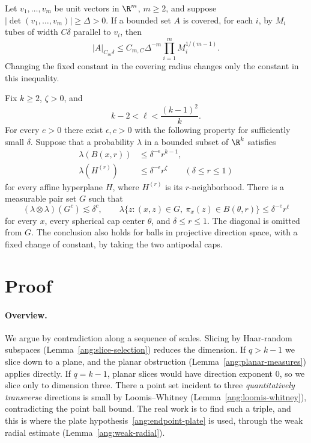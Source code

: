 \documentclass[11pt,reqno]{amsart}
\begin{document}
\begin{lemma}\label{ang:loomis-whitney}
Let $v_1,\ldots,v_m$ be unit vectors in $\R^m$, $m\ge2$, and suppose
$|\det(v_1,\ldots,v_m)|\ge\Delta>0$. If a bounded set $A$ is covered,
for each $i$, by $M_i$ tubes of width $C\delta$ parallel to $v_i$, then
\[
 |A|_{C_m\delta}\le C_{m,C}\Delta^{-m}
       \prod_{i=1}^m M_i^{1/(m-1)}.
\]
Changing the fixed constant in the covering radius changes only the
constant in this inequality.
\end{lemma}

\begin{lemma}\label{ang:weak-radial}
Fix $k\ge2$, $\zeta>0$, and
\[
 k-2<\ell<\frac{(k-1)^2}{k}.
\]
For every $e>0$ there exist $\epsilon,c>0$ with the following property
for sufficiently small $\delta$. Suppose that a probability $\lambda$
in a bounded subset of $\R^k$ satisfies
\begin{align*}
 \lambda(B(x,r))&\le\delta^{-\epsilon}r^{k-1},\\
 \lambda(H^{(r)})&\le\delta^{-\epsilon}r^\zeta
 \qquad(\delta\le r\le1)
\end{align*}
for every affine hyperplane $H$, where $H^{(r)}$ is its $r$-neighborhood.
There is a measurable pair set $G$ such that
\[
 (\lambda\otimes\lambda)(G^c)\lesssim\delta^c,
 \qquad
 \lambda\{z:(x,z)\in G,\ \pi_x(z)\in B(\theta,r)\}
       \le\delta^{-e}r^\ell
\]
for every $x$, every spherical cap center $\theta$, and
$\delta\le r\le1$. The diagonal is omitted from $G$. The conclusion
also holds for balls in projective direction space, with a fixed change
of constant, by taking the two antipodal caps.
\end{lemma}

\section*{Proof}
\paragraph{Overview.} We argue by contradiction along a sequence of scales. Slicing by Haar-random subspaces (Lemma~\ref{ang:slice-selection}) reduces the dimension. If $q>k-1$ we slice down to a plane, and the planar obstruction (Lemma~\ref{ang:planar-measures}) applies directly. If $q=k-1$, planar slices would have direction exponent $0$, so we slice only to dimension three. There a point set incident to three \emph{quantitatively transverse} directions is small by Loomis--Whitney (Lemma~\ref{ang:loomis-whitney}), contradicting the point ball bound. The real work is to find such a triple, and this is where the plate hypothesis~\eqref{ang:endpoint-plate} is used, through the weak radial estimate (Lemma~\ref{ang:weak-radial}).
\end{document}
